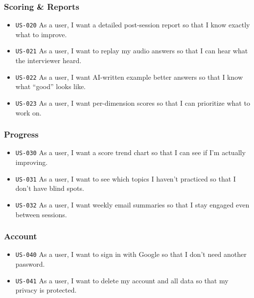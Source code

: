 \documentclass[
  11pt,
]{article}
\newcommand{\passthrough}[1]{#1}
\providecommand{\tightlist}{%
  \setlength{\itemsep}{0pt}\setlength{\parskip}{0pt}}
\begin{document}
\hypertarget{scoring-reports}{%
\subsubsection{Scoring \& Reports}\label{scoring-reports}}

\begin{itemize}
\tightlist
\item
  \passthrough{\lstinline!US-020!} As a user, I want a detailed
  post-session report so that I know exactly what to improve.
\item
  \passthrough{\lstinline!US-021!} As a user, I want to replay my audio
  answers so that I can hear what the interviewer heard.
\item
  \passthrough{\lstinline!US-022!} As a user, I want AI-written example
  better answers so that I know what ``good'' looks like.
\item
  \passthrough{\lstinline!US-023!} As a user, I want per-dimension
  scores so that I can prioritize what to work on.
\end{itemize}

\hypertarget{progress}{%
\subsubsection{Progress}\label{progress}}

\begin{itemize}
\tightlist
\item
  \passthrough{\lstinline!US-030!} As a user, I want a score trend chart
  so that I can see if I'm actually improving.
\item
  \passthrough{\lstinline!US-031!} As a user, I want to see which topics
  I haven't practiced so that I don't have blind spots.
\item
  \passthrough{\lstinline!US-032!} As a user, I want weekly email
  summaries so that I stay engaged even between sessions.
\end{itemize}

\hypertarget{account}{%
\subsubsection{Account}\label{account}}

\begin{itemize}
\tightlist
\item
  \passthrough{\lstinline!US-040!} As a user, I want to sign in with
  Google so that I don't need another password.
\item
  \passthrough{\lstinline!US-041!} As a user, I want to delete my
  account and all data so that my privacy is protected.
\end{itemize}
\end{document}
